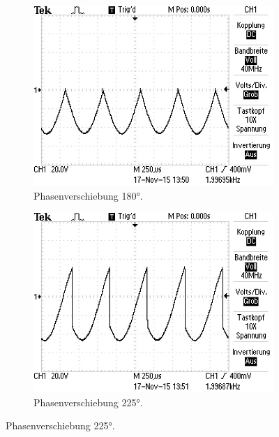 \begin{figure}
  \centering
  \begin{subfigure}{0.48\textwidth}
    \centering
    \includegraphics[width=\textwidth]{bilder/Ohne Rauschen/3.JPG}
    \caption{Phasenverschiebung 180°.}
    \label{fig:bild3}
  \end{subfigure}
  \begin{subfigure}{0.48\textwidth}
    \centering
    \includegraphics[width=\textwidth]{bilder/Ohne Rauschen/4.JPG}
    \caption{Phasenverschiebung 225°.}
    \label{fig:bild4}
  \end{subfigure}
\end{figure}
